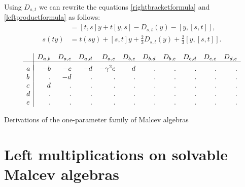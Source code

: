 \documentclass{amsart}
\theoremstyle{plain}
\theoremstyle{definition}
\begin{document}
Using $D_{s,t}$ we can rewrite the equations \eqref{rightbracketformula} and
\eqref{leftproductformula} as follows:
  \allowdisplaybreaks
  \begin{align}
  [ ty, s ] &= [t,s] y + t [y,s] - D_{s,t}(y) - [y,[s,t]],
  \label{rightbracket}
  \\
  s(ty) &= t(sy) + [s,t] y + \tfrac23 D_{s,t}(y) + \tfrac23 [y,[s,t]].
  \label{leftproduct}
  \end{align}

  \begin{table}
  \begin{center}
  \[
  \begin{array}{l|rrrrrrrrrr}
    & D_{a,b} & D_{a,c} & D_{a,d} & D_{a,e} & D_{b,c}
    & D_{b,d} & D_{b,e} & D_{c,d} & D_{c,e} & D_{d,e} \\ \hline
    &&&&&&&&&& \\[-8pt]
  a & -b & -c & -d & -\gamma^2 e & d & . & . & . & . & . \\
  b &  . & -d &  . & . & . & . & . & . & . & . \\
  c &  d &  . &  . & . & . & . & . & . & . & . \\
  d &  . &  . &  . & . & . & . & . & . & . & . \\
  e &  . &  . &  . & . & . & . & . & . & . & .
  \end{array}
  \]
  \end{center}
  \caption{Derivations of the one-parameter family of Malcev algebras}
  \label{derivationtable}
  \end{table}


\section{Left multiplications on solvable Malcev algebras}
\end{document}
